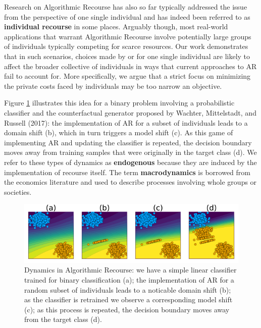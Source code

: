 \documentclass[conference,final,]{IEEEtran}
\begin{document}
Research on Algorithmic Recourse has also so far typically addressed the issue from the perspective of one single individual and has indeed been referred to as \textbf{individual recourse} in some places. Arguably though, most real-world applications that warrant Algorithmic Recourse involve potentially large groups of individuals typically competing for scarce resources. Our work demonstrates that in such scenarios, choices made by or for one single individual are likely to affect the broader collective of individuals in ways that current approaches to AR fail to account for. More specifically, we argue that a strict focus on minimizing the private costs faced by individuals may be too narrow an objective.

Figure \ref{fig:poc} illustrates this idea for a binary problem involving a probabilistic classifier and the counterfactual generator proposed by Wachter, Mittelstadt, and Russell (2017): the implementation of AR for a subset of individuals leads to a domain shift (b), which in turn triggers a model shift (c). As this game of implementing AR and updating the classifier is repeated, the decision boundary moves away from training samples that were originally in the target class (d). We refer to these types of dynamics as \textbf{endogenous} because they are induced by the implementation of recourse itself. The term \textbf{macrodynamics} is borrowed from the economics literature and used to describe processes involving whole groups or societies.

\begin{figure}

{\centering \includegraphics[width=0.9\linewidth]{www/poc} 

}

\caption{Dynamics in Algorithmic Recourse: we have a simple linear classifier trained for binary classification (a); the implementation of AR for a random subset of individuals leads to a noticable domain shift (b); as the classifier is retrained we observe a corresponding model shift (c); as this process is repeated, the decision boundary moves away from the target class (d).}\label{fig:poc}
\end{figure}
\end{document}
